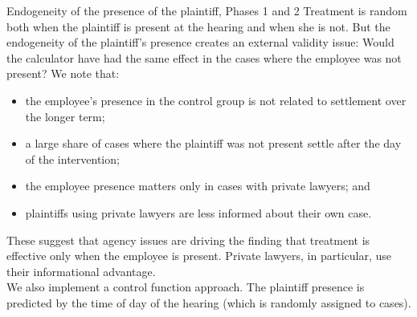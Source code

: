 \documentclass[9pt]{beamer}
\begin{document}
 \begin{frame}{Endogeneity of the presence of the plaintiff, Phases 1 and 2}
 \label{frame_Control_Function}
    Treatment is random both when the plaintiff is present at the hearing and when she is not.
    \vspace{.1in}
   But the endogeneity of the plaintiff's presence creates an external validity issue: Would the calculator have had the same effect in the cases where the employee was not present?
   \vspace{.1in}
   We note that:
   \begin{itemize}
    \item the employee's presence in the control group is not related to settlement over the longer term;
       \item a large share of cases where the plaintiff was not present settle after the day of the intervention;
       \item the employee presence matters only in cases with private lawyers; and
       \item plaintiffs using private lawyers are less informed about their own case.
   \end{itemize}
   \pause
   These suggest that agency issues are driving the finding that treatment is effective only when the employee is present. Private lawyers, in particular, use their informational advantage.
   \\
   \vspace{.1in}
    \pause
   We also implement a control function approach. The plaintiff presence is predicted by the time of day of the hearing (which is randomly assigned to cases).  \hyperlink{frame_Table3E}{}
\end{frame}
\end{document}
